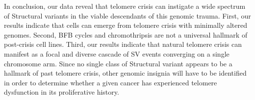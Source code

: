 \documentclass[phd,tocprelim]{cornell}
\begin{document}
In conclusion, our data reveal that telomere crisis can instigate a wide spectrum of Structural variants in the viable descendants of this genomic trauma. First, our results indicate that cells can emerge from telomere crisis with minimally altered genomes. Second, BFB cycles and chromothripsis are not a universal hallmark of post-crisis cell lines. Third, our results indicate that natural telomere crisis can manifest as a focal and diverse cascade of SV events converging on a single chromosome arm. Since no single class of Structural variant appears to be a hallmark of past telomere crisis, other genomic insignia will have to be identified in order to determine whether a given cancer has experienced telomere dysfunction in its proliferative history.


\end{document}
